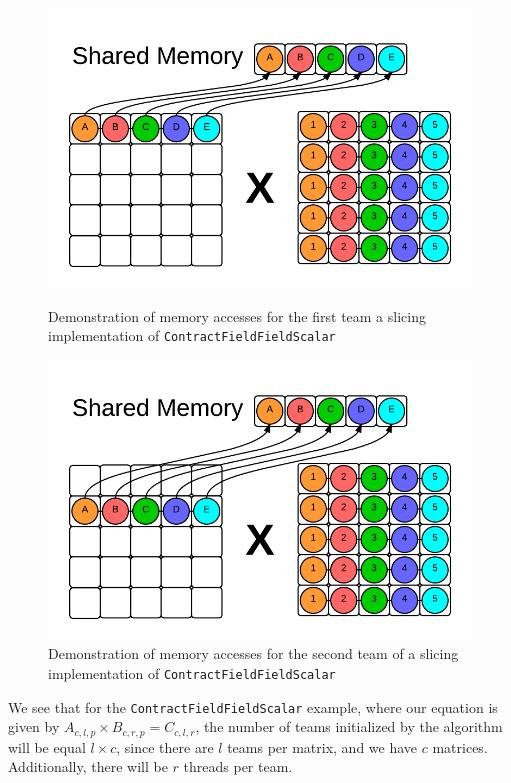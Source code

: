 \begin{figure}[H]
    \centering
    \includegraphics[scale = .55]{ContractFieldFieldScalarGraphic}
    \caption[Memory Accesses -- First Slicing Team]{Demonstration of memory accesses for the first team a slicing
        implementation of \texttt{ContractFieldFieldScalar}}
    \label{fig:Slicing}

    \includegraphics[scale = .55]{ContractFieldFieldScalarGraphic2}
    \caption[Memory Accesses -- Second Slicing Team]{Demonstration of memory accesses for
    the second team of a slicing implementation of
    \texttt{ContractFieldFieldScalar}}
    \label{fig:Slicing2}
\end{figure}

We see that for the \texttt{ContractFieldFieldScalar} example, where our equation is given by
$A_{c,l,p} \times B_{c, r, p} = C_{c,l, r}$, the
number of teams initialized by the algorithm will be equal $l \times c$,
since there are $l$ teams per matrix, and we have $c$ matrices.
Additionally, there will be $r$ threads per team. 


